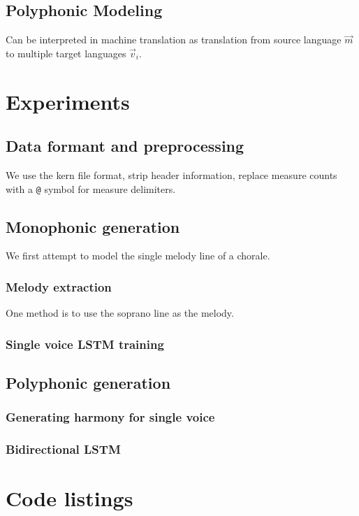 \documentclass[a4paper,oneside,reqno,onecolumn]{amsart}
\begin{document}
\subsection{Polyphonic Modeling}

Can be interpreted in machine translation as translation from source language $\vec{m}$
to multiple target languages $\vec{v}_i$.

\section{Experiments}

\subsection{Data formant and preprocessing}

We use the kern file format, strip header information, replace measure counts
with a \texttt{@} symbol for measure delimiters.

\subsection{Monophonic generation}

We first attempt to model the single melody line of a chorale.

\subsubsection{Melody extraction}

One method is to use the soprano line as the melody.


\subsubsection{Single voice LSTM training}

\subsection{Polyphonic generation}

\subsubsection{Generating harmony for single voice}

\subsubsection{Bidirectional LSTM}


\nocite{*}


\onecolumn

\appendix

\section{Code listings}
\end{document}
